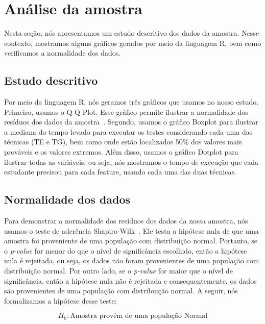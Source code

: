 \section{An\'alise da amostra}
\label{sec:analise}

Nesta seção, nós apresentamos um estudo descritivo dos dados da amostra. Nesse contexto, mostramos alguns gráficos gerados por meio da linguagem R, bem como verificamos a normalidade dos dados.

\subsection{Estudo descritivo}
\label{sec:estudo}

Por meio da linguagem R, nós geramos três gráficos que usamos no nosso estudo. Primeiro, usamos o Q-Q Plot. Esse gráfico permite ilustrar a normalidade dos resíduos dos dados da amostra~\cite{Wilk1968}. Segundo, usamos o gráfico Boxplot para ilustrar a mediana do tempo levado para executar os testes considerando cada uma das técnicas (TE e TG), bem como onde estão localizados 50\% dos valores mais prováveis e os valores extremos. Além disso, usamos o gráfico Dotplot para ilustrar todas as variáveis, ou seja, nós mostramos o tempo de execução que cada estudante precisou para cada feature, usando cada uma das duas técnicas.

\subsection{Normalidade dos dados}
\label{sec:normalidade}

Para demonstrar a normalidade dos resíduos dos dados da nossa amostra, nós usamos o teste de aderência Shapiro-Wilk~\cite{shapirowilk}. Ele testa a hipótese nula de que uma amostra foi proveniente de uma população com distribuição normal. Portanto, se o \emph{p-value} for menor do que o nível de significância escolhido, então a hipótese nula é rejeitada, ou seja, os dados não foram provenientes de uma população com distribuição normal. Por outro lado, se o \emph{p-value} for maior que o nível de significância, então a hipótese nula não é rejeitada e consequentemente, os dados são provenientes de uma população com distribuição normal. A seguir, nós formalizamos a hipótese desse teste:

\begin{equation}
	H_{0} : \text{Amostra provém de uma população Normal}
\end{equation}

